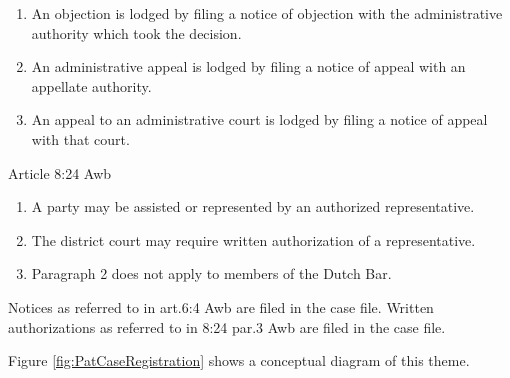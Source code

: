 \documentclass[10pt,a4paper]{report}              %
\theoremstyle{plain}\theorembodyfont{\rmfamily}\newtheorem{definition}{Definition}[section]
\theoremstyle{plain}\theorembodyfont{\rmfamily}\newtheorem{designrule}[definition]{Requirement}
\begin{document}
\begin{enumerate}[1.]
\item
  An objection is lodged by filing a notice of objection with the
  administrative authority which took the decision.
\item
  An administrative appeal is lodged by filing a notice of appeal with
  an appellate authority.
\item
  An appeal to an administrative court is lodged by filing a notice of
  appeal with that court.
\end{enumerate}
Article 8:24 Awb

\begin{enumerate}[1.]
\item
  A party may be assisted or represented by an authorized
  representative.
\item
  The district court may require written authorization of a
  representative.
\item
  Paragraph 2 does not apply to members of the Dutch Bar.
\end{enumerate}
Notices as referred to in art.6:4 Awb are filed in the case file.
Written authorizations as referred to in 8:24 par.3 Awb are filed in the
case file.

Figure \ref{fig:PatCaseRegistration} shows a conceptual diagram of this theme.
\end{document}
